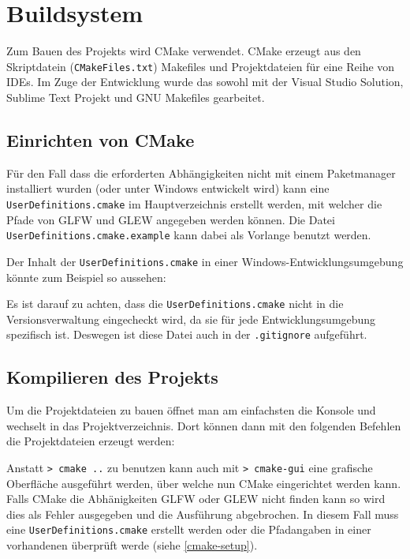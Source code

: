 \documentclass[12pt, a4paper, titlepage, hidelinks]{scrreprt}
\begin{document}
\section{Buildsystem}
Zum Bauen des Projekts wird CMake verwendet. CMake erzeugt aus den Skriptdatein (\texttt{CMakeFiles.txt}) Makefiles und Projektdateien für eine Reihe von IDEs. Im Zuge der Entwicklung wurde das sowohl mit der Visual Studio Solution, Sublime Text Projekt und GNU Makefiles gearbeitet.  

\subsection{Einrichten von CMake}
\label{cmake-setup}
Für den Fall dass die erforderten Abhängigkeiten nicht mit einem Paketmanager installiert wurden (oder unter Windows entwickelt wird) kann eine \texttt{UserDefinitions.cmake} im Hauptverzeichnis erstellt werden, mit welcher die Pfade von GLFW und GLEW angegeben werden können. Die Datei \texttt{UserDefinitions.cmake.example} kann dabei als Vorlange benutzt werden.

Der Inhalt der \texttt{UserDefinitions.cmake} in einer Windows-Entwicklungsumgebung könnte zum Beispiel so aussehen:


Es ist darauf zu achten, dass die \texttt{UserDefinitions.cmake} nicht in die Versionsverwaltung eingecheckt wird, da sie für jede Entwicklungsumgebung spezifisch ist. Deswegen ist diese Datei auch in der \texttt{.gitignore} aufgeführt.

\subsection{Kompilieren des Projekts}
Um die Projektdateien zu bauen öffnet man am einfachsten die Konsole und wechselt in das Projektverzeichnis. Dort können dann mit den folgenden Befehlen die Projektdateien erzeugt werden:

Anstatt \texttt{>~cmake ..} zu benutzen kann auch mit \texttt{>~cmake-gui} eine grafische Oberfläche ausgeführt werden, über welche nun CMake eingerichtet werden kann. Falls CMake die Abhänigkeiten GLFW oder GLEW nicht finden kann so wird dies als Fehler ausgegeben und die Ausführung abgebrochen. In diesem Fall muss eine \texttt{UserDefinitions.cmake} erstellt werden oder die Pfadangaben in einer vorhandenen überprüft werde (siehe \autoref{cmake-setup}).
\end{document}
